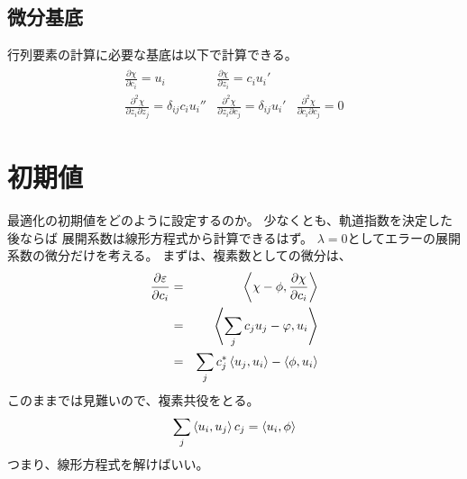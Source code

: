 \documentclass[a4paper]{jsarticle}
\begin{document}
\subsection{微分基底}
行列要素の計算に必要な基底は以下で計算できる。
\begin{eqnarray}
  \begin{array}{ccc}
    \displaystyle
    \frac{\partial \chi}{\partial c_i} = u_i &
    \displaystyle
    \frac{\partial \chi}{\partial z_i} = c_iu_i' &  \\
    \displaystyle
    \frac{\partial^2 \chi}{\partial z_i \partial z_j} = \delta_{ij}c_iu_i'' &
    \displaystyle
    \frac{\partial^2 \chi}{\partial z_i \partial c_j} = \delta_{ij}u_i' &
    \displaystyle
    \frac{\partial^2 \chi}{\partial c_i \partial c_j} = 0
  \end{array}
\end{eqnarray}





\section{初期値}
最適化の初期値をどのように設定するのか。
少なくとも、軌道指数を決定した後ならば
展開系数は線形方程式から計算できるはず。
$\lambda =0$としてエラーの展開系数の微分だけを考える。
まずは、複素数としての微分は、
\begin{eqnarray}
  \frac{\partial \varepsilon}{\partial c_i} &=&
  \Braket{\chi - \phi, \frac{\partial \chi}{\partial c_i}} \\ &=&
  \Braket{\sum_j c_ju_j - \varphi, u_i} \\ &=&
  \sum_j c_j^* \Braket{u_j, u_i} - \Braket{\phi, u_i} 
\end{eqnarray}
このままでは見難いので、複素共役をとる。
\begin{eqnarray}
  \sum_j \Braket{u_i, u_j} c_j = \Braket{u_i, \phi}
\end{eqnarray}
つまり、線形方程式を解けばいい。
\end{document}
